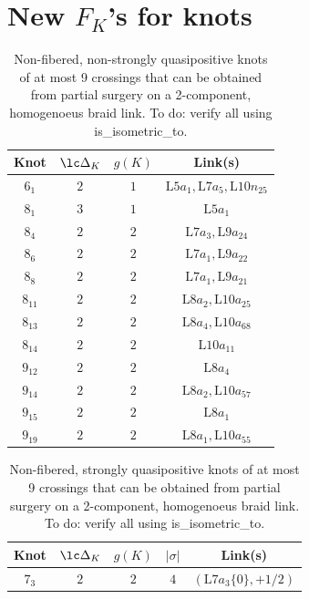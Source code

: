 \documentclass[11pt,e-only]{amsart}
\begin{document}
\section{New $F_K$'s for knots}


\begin{table}[h!]
    \centering
    \begin{tabular}{|c|c|c|c|}
        \hline
        Knot & $\lc \Delta_K$ & $g(K)$ & Link(s) \\
        \hline
        $6_1$ & $2$ & $1$ & $\mathrm{L}5a_{1},\mathrm{L}7a_{5},\mathrm{L}10n_{25}$ \\
        $8_1$ & $3$ & $1$ & $\mathrm{L}5a_{1}$ \\
        $8_4$ & $2$ & $2$ & $\mathrm{L}7a_{3},\mathrm{L}9a_{24}$ \\
        $8_6$ & $2$ & $2$ & $\mathrm{L}7a_{1},\mathrm{L}9a_{22}$ \\
        $8_8$ & $2$ & $2$ & $\mathrm{L}7a_{1},\mathrm{L}9a_{21}$ \\
        $8_{11}$ & $2$ & $2$ & $\mathrm{L}8a_{2},\mathrm{L}10a_{25}$ \\
        $8_{13}$ & $2$ & $2$ & $\mathrm{L}8a_{4},\mathrm{L}10a_{68}$ \\
        $8_{14}$ & $2$ & $2$ & $\mathrm{L}10a_{11}$ \\
        $9_{12}$ & $2$ & $2$ & $\mathrm{L}8a_{4}$ \\
        $9_{14}$ & $2$ & $2$ & $\mathrm{L}8a_{2},\mathrm{L}10a_{57}$ \\
        $9_{15}$ & $2$ & $2$ & $\mathrm{L}8a_{1}$ \\
        $9_{19}$ & $2$ & $2$ & $\mathrm{L}8a_{1},\mathrm{L}10a_{55}$ \\
        \hline
    \end{tabular}
    \caption{Non-fibered, non-strongly quasipositive knots of at most 9 crossings that can be obtained from partial surgery on a 2-component, homogenoeus braid link. \alert{To do: verify all using is\_isometric\_to.} }
    \label{tab:knots-and-partial-surgeries}
\end{table}

\begin{table}[h!]
    \centering
    \begin{tabular}{|c|c|c|c|c|}
        \hline
        Knot & $\lc \Delta_K$ & $g(K)$ & $|\sigma|$ & Link(s) \\
        \hline
        $7_3$ & $2$ & $2$ & $4$ & $\left(\mathrm{L}7a_{3}\{0\},+1/2\right)$ \\
        \hline
    \end{tabular}
    \caption{Non-fibered, strongly quasipositive knots of at most 9 crossings that can be obtained from partial surgery on a 2-component, homogenoeus braid link. \alert{To do: verify all using is\_isometric\_to.}}
    \label{tab:knots-and-partial-surgeries}
\end{table}
\end{document}
